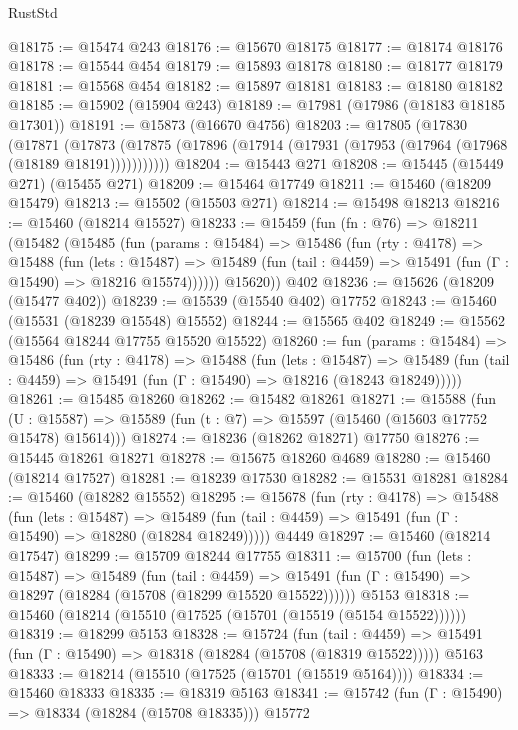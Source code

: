 \begin{lexlean}{RustStd}
\begin{coremodule}
@18175 := @15474 @243
@18176 := @15670 @18175
@18177 := @18174 @18176
@18178 := @15544 @454
@18179 := @15893 @18178
@18180 := @18177 @18179
@18181 := @15568 @454
@18182 := @15897 @18181
@18183 := @18180 @18182
@18185 := @15902 (@15904 @243)
@18189 := @17981 (@17986 (@18183 @18185 @17301))
@18191 := @15873 (@16670 @4756)
@18203 := @17805
    (@17830
      (@17871
        (@17873 (@17875 (@17896 (@17914 (@17931 (@17953 (@17964 (@17968 (@18189 @18191)))))))))))
@18204 := @15443 @271
@18208 := @15445 (@15449 @271) (@15455 @271)
@18209 := @15464 @17749
@18211 := @15460 (@18209 @15479)
@18213 := @15502 (@15503 @271)
@18214 := @15498 @18213
@18216 := @15460 (@18214 @15527)
@18233 := @15459
    (fun (fn : @76) =>
    @18211
      (@15482
        (@15485
          (fun (params : @15484) =>
          @15486
            (fun (rty : @4178) =>
            @15488
              (fun (lets : @15487) =>
              @15489 (fun (tail : @4459) => @15491 (fun (Γ : @15490) => @18216 @15574))))))
        @15620))
    @402
@18236 := @15626 (@18209 (@15477 @402))
@18239 := @15539 (@15540 @402) @17752
@18243 := @15460 (@15531 (@18239 @15548) @15552)
@18244 := @15565 @402
@18249 := @15562 (@15564 @18244 @17755 @15520 @15522)
@18260 := fun (params : @15484) =>
  @15486
    (fun (rty : @4178) =>
    @15488
      (fun (lets : @15487) =>
      @15489 (fun (tail : @4459) => @15491 (fun (Γ : @15490) => @18216 (@18243 @18249)))))
@18261 := @15485 @18260
@18262 := @15482 @18261
@18271 := @15588
    (fun (U : @15587) => @15589 (fun (t : @7) => @15597 (@15460 (@15603 @17752 @15478) @15614)))
@18274 := @18236 (@18262 @18271) @17750
@18276 := @15445 @18261 @18271
@18278 := @15675 @18260 @4689
@18280 := @15460 (@18214 @17527)
@18281 := @18239 @17530
@18282 := @15531 @18281
@18284 := @15460 (@18282 @15552)
@18295 := @15678
    (fun (rty : @4178) =>
    @15488
      (fun (lets : @15487) =>
      @15489 (fun (tail : @4459) => @15491 (fun (Γ : @15490) => @18280 (@18284 @18249)))))
    @4449
@18297 := @15460 (@18214 @17547)
@18299 := @15709 @18244 @17755
@18311 := @15700
    (fun (lets : @15487) =>
    @15489
      (fun (tail : @4459) =>
      @15491 (fun (Γ : @15490) => @18297 (@18284 (@15708 (@18299 @15520 @15522))))))
    @5153
@18318 := @15460 (@18214 (@15510 (@17525 (@15701 (@15519 (@5154 @15522))))))
@18319 := @18299 @5153
@18328 := @15724
    (fun (tail : @4459) => @15491 (fun (Γ : @15490) => @18318 (@18284 (@15708 (@18319 @15522)))))
    @5163
@18333 := @18214 (@15510 (@17525 (@15701 (@15519 @5164))))
@18334 := @15460 @18333
@18335 := @18319 @5163
@18341 := @15742 (fun (Γ : @15490) => @18334 (@18284 (@15708 @18335))) @15772

\end{coremodule}
\end{lexlean}
